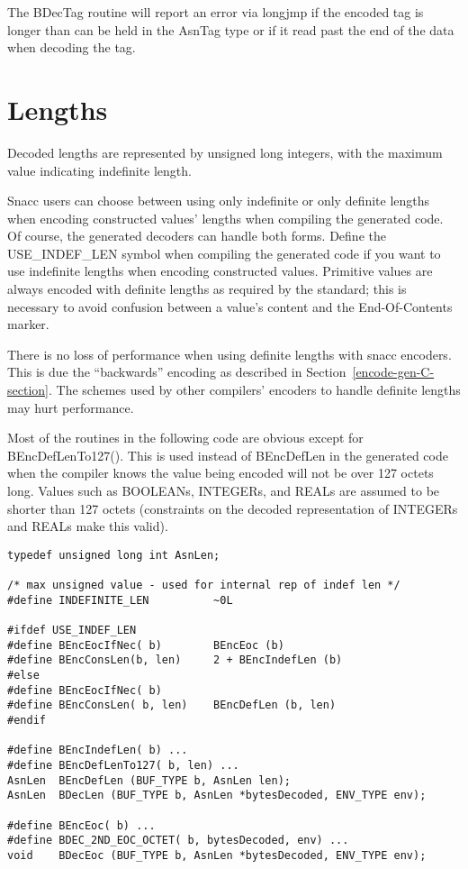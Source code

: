 The {\C BDecTag} routine will report an error via {\C longjmp} if
the encoded tag is longer than can be held in the {\C AsnTag} type
or if it read past the end of the data when decoding the tag.

\section{\label{len-C-section}Lengths}

Decoded lengths are represented by unsigned long integers, with the
maximum value indicating indefinite length.

Snacc users can choose between using only indefinite or only definite
lengths when encoding constructed values' lengths when compiling the
generated code.  Of course, the generated decoders can handle both
forms.  Define the {\C USE\_INDEF\_LEN} symbol when compiling the
generated code if you want to use indefinite lengths when encoding
constructed values.  Primitive values are always encoded with definite
lengths as required by the standard; this is necessary to avoid
confusion between a value's content and the End-Of-Contents marker.

There is no loss of performance when using definite lengths with snacc
encoders.  This is due the ``backwards'' encoding as described in
Section~\ref{encode-gen-C-section}.  The schemes used by other compilers'
encoders to handle definite lengths may hurt performance.

Most of the routines in the following code are obvious except for
{\C BEncDefLenTo127()}.  This is used instead of {\C BEncDefLen}
in the generated code when the compiler knows the value being encoded
will not be over 127 octets long.  Values such as BOOLEANs,
INTEGERs, and REALs are assumed to be shorter than 127 octets
(constraints on the decoded representation of INTEGERs and REALs make
this valid).
\begin{small}
\begin{verbatim}
typedef unsigned long int AsnLen;

/* max unsigned value - used for internal rep of indef len */
#define INDEFINITE_LEN          ~0L

#ifdef USE_INDEF_LEN
#define BEncEocIfNec( b)        BEncEoc (b)
#define BEncConsLen(b, len)     2 + BEncIndefLen (b)
#else
#define BEncEocIfNec( b)
#define BEncConsLen( b, len)    BEncDefLen (b, len)
#endif

#define BEncIndefLen( b) ...
#define BEncDefLenTo127( b, len) ...
AsnLen  BEncDefLen (BUF_TYPE b, AsnLen len);
AsnLen  BDecLen (BUF_TYPE b, AsnLen *bytesDecoded, ENV_TYPE env);

#define BEncEoc( b) ...
#define BDEC_2ND_EOC_OCTET( b, bytesDecoded, env) ...
void    BDecEoc (BUF_TYPE b, AsnLen *bytesDecoded, ENV_TYPE env);
\end{verbatim}
\end{small}

